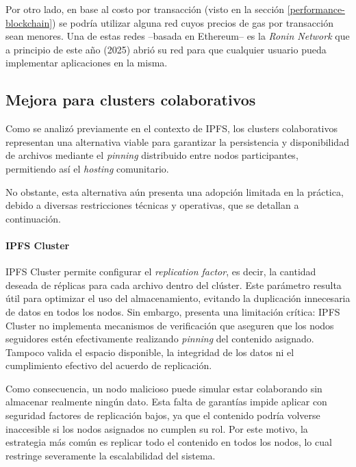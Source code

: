 Por otro lado, en base al costo por transacción (visto en la sección \ref{performance-blockchain}) se podría utilizar alguna red cuyos precios de gas por transacción sean menores. Una de estas redes --basada en Ethereum-- es la \textit{Ronin Network} \cite{ronin-network} \cite{ronin-network-whitepaper} que a principio de este año (2025) abrió su red para que cualquier usuario pueda implementar aplicaciones en la misma.

\subsection{Mejora para clusters colaborativos}

Como se analizó previamente en el contexto de IPFS, los clusters colaborativos representan una alternativa viable para garantizar la persistencia y disponibilidad de archivos mediante el \textit{pinning} distribuido entre nodos participantes, permitiendo así el \textit{hosting} comunitario.

No obstante, esta alternativa aún presenta una adopción limitada en la práctica, debido a diversas restricciones técnicas y operativas, que se detallan a continuación.

\paragraph{IPFS Cluster}

IPFS Cluster permite configurar el \textit{replication factor}, es decir, la cantidad deseada de réplicas para cada archivo dentro del clúster. Este parámetro resulta útil para optimizar el uso del almacenamiento, evitando la duplicación innecesaria de datos en todos los nodos. Sin embargo, presenta una limitación crítica: IPFS Cluster no implementa mecanismos de verificación que aseguren que los nodos seguidores estén efectivamente realizando \textit{pinning} del contenido asignado. Tampoco valida el espacio disponible, la integridad de los datos ni el cumplimiento efectivo del acuerdo de replicación.

Como consecuencia, un nodo malicioso puede simular estar colaborando sin almacenar realmente ningún dato. Esta falta de garantías impide aplicar con seguridad factores de replicación bajos, ya que el contenido podría volverse inaccesible si los nodos asignados no cumplen su rol. Por este motivo, la estrategia más común es replicar todo el contenido en todos los nodos, lo cual restringe severamente la escalabilidad del sistema.

